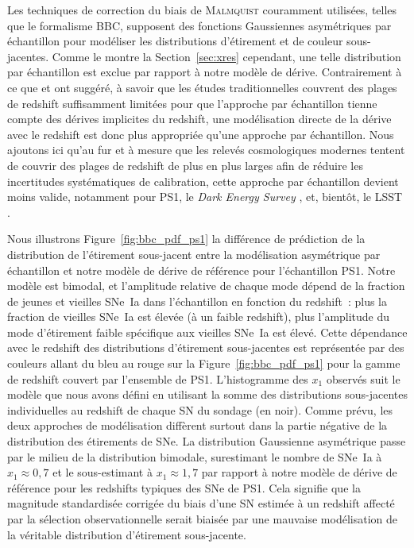 \documentclass[../main/main.tex]{subfiles}
\begin{document}
Les techniques de correction du biais de \textsc{Malmquist} couramment
utilisées, telles que le formalisme BBC, supposent des fonctions Gaussiennes
asymétriques par échantillon pour modéliser les distributions d'étirement et de
couleur sous-jacentes. Comme le montre la Section~\ref{sec:xres} cependant, une
telle distribution par échantillon est exclue par rapport à notre modèle de
dérive. Contrairement à ce que \citep[Section 2]{scolnic2016} et \citep[Section
5.4]{scolnic2018} ont suggéré, à savoir que les études traditionnelles couvrent
des plages de redshift suffisamment limitées pour que l'approche par échantillon
tienne compte des dérives implicites du redshift, une modélisation directe de la
dérive avec le redshift est donc plus appropriée qu'une approche par
échantillon. Nous ajoutons ici qu'au fur et à mesure que les relevés
cosmologiques modernes tentent de couvrir des plages de redshift de plus en plus
larges afin de réduire les incertitudes systématiques de calibration, cette
approche par échantillon devient moins valide, notamment pour PS1, le
\textit{Dark Energy Survey} \citep[DES,][]{abbott2019}, et, bientôt, le LSST
\citep{ivezic2019}.

Nous illustrons Figure~\ref{fig:bbc_pdf_ps1} la différence de prédiction de la
distribution de l'étirement sous-jacent entre la modélisation asymétrique par
échantillon et notre modèle de dérive de référence pour l'échantillon PS1. Notre
modèle est bimodal, et l'amplitude relative de chaque mode dépend de la fraction
de jeunes et vieilles SNe~Ia dans l'échantillon en fonction du redshift~: plus
la fraction de vieilles SNe~Ia est élevée (à un faible redshift), plus
l'amplitude du mode d'étirement faible spécifique aux vieilles SNe~Ia est élevé.
Cette dépendance avec le redshift des distributions d'étirement sous-jacentes
est représentée par des couleurs allant du bleu au rouge sur la
Figure~\ref{fig:bbc_pdf_ps1} pour la gamme de redshift couvert par l'ensemble de
PS1. L'histogramme des $x_1$ observés suit le modèle que nous avons défini en
utilisant la somme des distributions sous-jacentes individuelles au redshift de
chaque SN du sondage (en noir). Comme prévu, les deux approches de modélisation
diffèrent surtout dans la partie négative de la distribution des étirements de
SNe. La distribution Gaussienne asymétrique passe par le milieu de la
distribution bimodale, surestimant le nombre de SNe~Ia à $x_1 \approx 0,7$ et
le sous-estimant à $x_1 \approx 1,7$ par rapport à notre modèle de dérive de
référence pour les redshifts typiques des SNe de PS1. Cela signifie que la
magnitude standardisée corrigée du biais d'une SN estimée à un redshift affecté
par la sélection observationnelle serait biaisée par une mauvaise modélisation
de la véritable distribution d'étirement sous-jacente.
\end{document}
